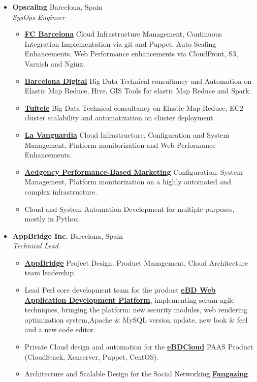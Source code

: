 \documentclass[]{friggeri-cv} %
\renewenvironment{entrylist}{%
  \begin{itemize}[leftmargin=1in]%
}{%
  \end{itemize}
}
\renewcommand{\entry}[4]{%
  \item[#1]
    \textbf{#2}%
    \hfill%
    {\footnotesize\addfontfeature{Color=lightgray} #3}\\%
    #4\vspace{\parsep}%
  }
\begin{document}
\begin{entrylist}
\entry
{2014--2014}
{Opscaling}
{Barcelona, Spain}
{\emph{SysOps Engineer} 
\begin{itemize}[label=\textbullet]
\item \href{http://www.fcbarcelona.com/}{\textbf{FC Barcelona}} Cloud Infrastructure Management, Continuous Integration Implementation via git and Puppet, Auto Scaling Enhancements, Web Performance enhancements via CloudFront, S3, Varnish and Nginx.
\item \href{http://www.bdigital.org/}{\textbf{Barcelona Digital}} Big Data Technical consultancy and Automation on Elastic Map Reduce, Hive, GIS Tools for elastic Map Reduce and Spark.
\item \href{http://www.tuitele.tv/}{\textbf{Tuitele}} Big Data Technical consultancy on Elastic Map Reduce, EC2 cluster scalability and automatization on cluster deployment.
\item \href{http://www.lavanguardia.com/}{\textbf{La Vanguardia}} Cloud Infrastructure, Configuration and System Management, Platform monitorization and Web Performance Enhancements.
\item \href{http://www.aedgency.com/}{\textbf{Aedgency Performance-Based Marketing}} Configuration, System Management, Platform monitorization on a highly automated and complex infrastructure.
\item Cloud and System Automation Development for multiple purposes, mostly in Python.   
\end{itemize}}
\entry
{2012--2014}
{AppBridge Inc.}
{Barcelona, Spain}
{\emph{Technical Lead} 
\begin{itemize}[label=\textbullet]
\item \href{http://www.appbridge.com}{\textbf{AppBridge}} Project Design, Product Management, Cloud Architecture team leadership.
\item Lead Perl core development team for the product \href{http://www.ebdsoft.com}{\textbf{eBD Web Application Development Platform}}, implementing scrum agile techniques, bringing the platform: new security modules, web rendering optimization system,Apache \& MySQL version update, new look \& feel and a new code editor.
\item Private Cloud design and automation for the  \href{http://www.ebdcloud.com}{\textbf{eBDCloud}} PAAS Product (CloudStack, Xenserver, Puppet, CentOS).
\item Architecture and Scalable Design for the Social Networking \href{http://www.fangazing.com/berto}{\textbf{Fangazing}}.

\end{itemize}}
\end{entrylist}
\end{document}
